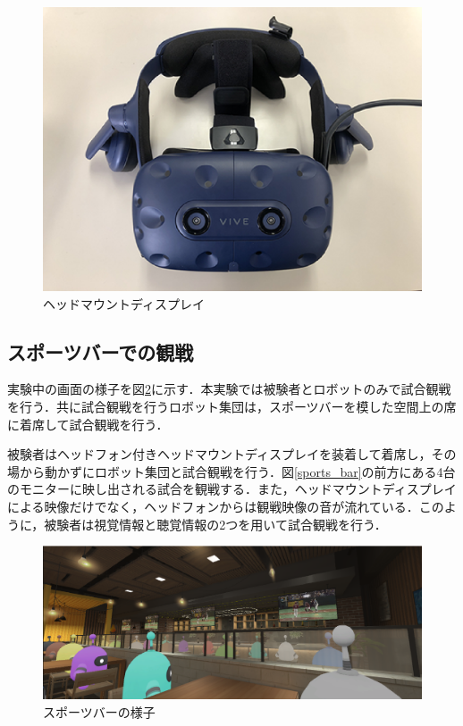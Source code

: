 \vspace{1cm}
 \begin{figure}[!h]
 \begin{center}
  \centering
  \includegraphics[width=12cm]{images/chapter3/Vive.eps}
  \caption{ヘッドマウントディスプレイ}
  \label{Vive}
 \end{center}
\end{figure}


\subsection{スポーツバーでの観戦}
\label{sec3.2.1}

実験中の画面の様子を図\ref{bar_scene}に示す．本実験では被験者とロボットのみで試合観戦を行う．共に試合観戦を行うロボット集団は，スポーツバーを模した空間上の席に着席して試合観戦を行う．

被験者はヘッドフォン付きヘッドマウントディスプレイを装着して着席し，その場から動かずにロボット集団と試合観戦を行う．図\ref{sports_bar}の前方にある4台のモニターに映し出される試合を観戦する．また，ヘッドマウントディスプレイによる映像だけでなく，ヘッドフォンからは観戦映像の音が流れている．このように，被験者は視覚情報と聴覚情報の2つを用いて試合観戦を行う．




\vspace{1cm}
 \begin{figure}[!h]
 \begin{center}
  \centering
  \includegraphics[width=15cm]{images/chapter3/bar_scene.eps}
  \caption{スポーツバーの様子}
  \label{bar_scene}
 \end{center}
\end{figure}



